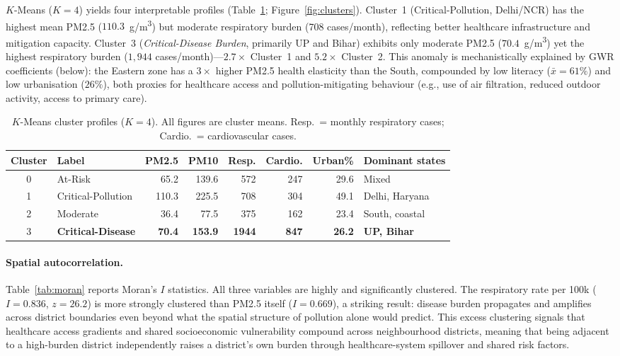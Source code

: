 \documentclass{article}
\begin{document}
$K$-Means ($K = 4$) yields four interpretable profiles (Table~\ref{tab:clusters};
Figure~\ref{fig:clusters}). Cluster~1 (Critical-Pollution, Delhi/NCR) has the highest
mean PM2.5 ($110.3$~\textmu{}g/m\textsuperscript{3}) but moderate respiratory burden
(708 cases/month), reflecting better healthcare infrastructure and mitigation capacity.
Cluster~3 (\emph{Critical-Disease Burden}, primarily UP and Bihar) exhibits only moderate
PM2.5 ($70.4$~\textmu{}g/m\textsuperscript{3}) yet the highest respiratory burden
($1{,}944$ cases/month)---$2.7\times$ Cluster~1 and $5.2\times$ Cluster~2. This anomaly
is mechanistically explained by GWR coefficients (below): the Eastern zone has a
$3\times$ higher PM2.5 health elasticity than the South, compounded by low literacy
($\bar{x} = 61\%$) and low urbanisation ($26\%$), both proxies for healthcare access
and pollution-mitigating behaviour (e.g., use of air filtration, reduced outdoor activity,
access to primary care).

\begin{table}[ht]
  \caption{$K$-Means cluster profiles ($K = 4$). All figures are cluster means.
  Resp.\ = monthly respiratory cases; Cardio.\ = cardiovascular cases.}
  \label{tab:clusters}
  \centering
  \small
  \begin{tabular}{clrrrrrl}
    \toprule
    Cluster & Label & PM2.5 & PM10 & Resp. & Cardio. & Urban\% & Dominant states \\
    \midrule
    0 & At-Risk            & 65.2  & 139.6 & 572  & 247 & 29.6 & Mixed \\
    1 & Critical-Pollution & 110.3 & 225.5 & 708  & 304 & 49.1 & Delhi, Haryana \\
    2 & Moderate           & 36.4  & 77.5  & 375  & 162 & 23.4 & South, coastal \\
    3 & \textbf{Critical-Disease}   & \textbf{70.4}  & \textbf{153.9} & \textbf{1944} & \textbf{847} & \textbf{26.2} & \textbf{UP, Bihar} \\
    \bottomrule
  \end{tabular}
\end{table}

\paragraph{Spatial autocorrelation.}
Table~\ref{tab:moran} reports Moran's $I$ statistics. All three variables are highly and
significantly clustered. The respiratory rate per 100k ($I = 0.836$, $z = 26.2$) is more
strongly clustered than PM2.5 itself ($I = 0.669$), a striking result: disease burden
propagates and amplifies across district boundaries even beyond what the spatial structure
of pollution alone would predict. This excess clustering signals that healthcare access
gradients and shared socioeconomic vulnerability compound across neighbourhood districts,
meaning that being adjacent to a high-burden district independently raises a district's
own burden through healthcare-system spillover and shared risk factors.
\end{document}
